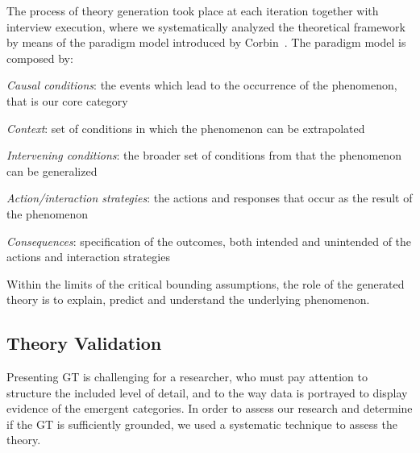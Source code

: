 \documentclass[10pt,journal,letterpaper,compsoc]{IEEEtran}
\begin{document}
The process of theory generation took place at each iteration together with
interview execution, where we systematically analyzed the theoretical framework
by means of the paradigm model introduced by Corbin~\cite{Corbin1990}. The
paradigm model is composed by:

\begin{compactitem} 
\item \textit{Causal conditions}: the events which lead to the occurrence of 
the phenomenon, that is our core category 
\item \textit{Context}: set of conditions in which the phenomenon can be 
extrapolated
\item \textit{Intervening conditions}: the broader set of conditions from that
the phenomenon can be generalized 
\item \textit{Action/interaction strategies}: the actions and responses that 
occur as the result of the phenomenon 
\item \textit{Consequences}: specification of the outcomes, both intended and
unintended of the actions and interaction strategies 
\end{compactitem}

Within the limits of the critical bounding assumptions, the role of the
generated theory is to explain, predict and understand the underlying
phenomenon.

\subsection{Theory Validation} \label{rm:val} 

Presenting GT is challenging for a researcher, who must pay attention to
structure the included level of detail, and to the way data is portrayed to
display evidence of the emergent categories. In order to assess our research
and determine if the GT is sufficiently grounded, we used a systematic technique
to assess the theory.
\end{document}
